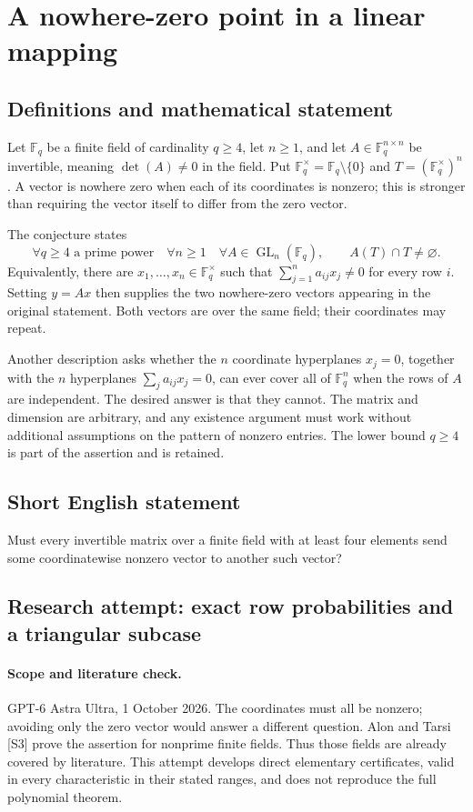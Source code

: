 \documentclass[11pt,a4paper]{article}
\begin{document}
\section*{A nowhere-zero point in a linear mapping}\label{statement}

\subsection{Definitions and mathematical statement}
Let $\mathbb F_q$ be a finite field of cardinality $q\ge4$, let $n\ge1$,
and let $A\in\mathbb F_q^{n\times n}$ be invertible, meaning
$\det(A)\ne0$ in the field. Put
$\mathbb F_q^\times=\mathbb F_q\setminus\{0\}$ and
$T=(\mathbb F_q^\times)^n$.
A vector is nowhere zero when each of its coordinates is nonzero; this
is stronger than requiring the vector itself to differ from the zero vector.

The conjecture states
\[
 \forall q\ge4\text{ a prime power}\quad\forall n\ge1\quad
 \forall A\in\operatorname{GL}_n(\mathbb F_q),\qquad
 A(T)\cap T\ne\varnothing.
\]
Equivalently, there are $x_1,\ldots,x_n\in\mathbb F_q^\times$ such that
$\sum_{j=1}^n a_{ij}x_j\ne0$ for every row $i$. Setting $y=Ax$ then
supplies the two nowhere-zero vectors appearing in the original statement.
Both vectors are over the same field; their coordinates may repeat.

Another description asks whether the $n$ coordinate hyperplanes
$x_j=0$, together with the $n$ hyperplanes
$\sum_j a_{ij}x_j=0$, can ever cover all of $\mathbb F_q^n$ when the rows
of $A$ are independent. The desired answer is that they cannot.
The matrix and dimension are arbitrary, and any existence argument must
work without additional assumptions on the pattern of nonzero entries.
The lower bound $q\ge4$ is part of the assertion and is retained.
\subsection{Short English statement}
Must every invertible matrix over a finite field with at least four elements send some coordinatewise nonzero vector to another such vector?
\subsection{Research attempt: exact row probabilities and a triangular subcase}
\paragraph{Scope and literature check.}
GPT-6 Astra Ultra, 1 October 2026. The coordinates must all be nonzero;
avoiding only the zero vector would answer a different question. Alon
and Tarsi [S3] prove the assertion for nonprime finite fields. Thus those
fields are already covered by literature. This attempt develops direct
elementary certificates, valid in every characteristic in their stated
ranges, and does not reproduce the full polynomial theorem.
\end{document}
